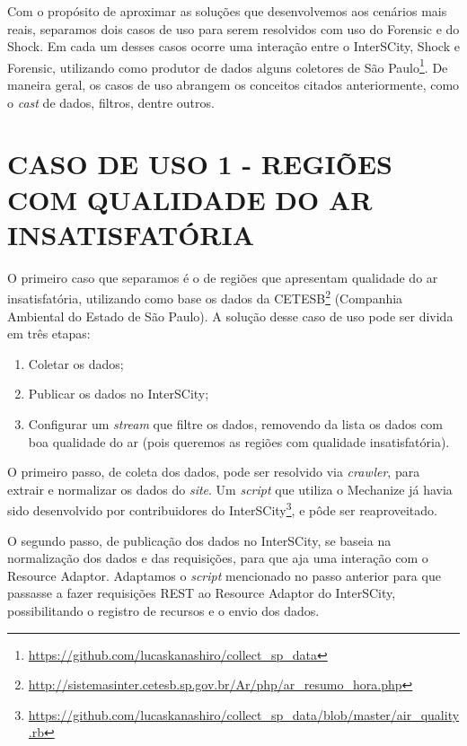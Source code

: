 Com o propósito de aproximar as soluções que desenvolvemos aos cenários mais
reais, separamos dois casos de uso para serem resolvidos com uso do Forensic e do
Shock. Em cada um desses casos ocorre uma interação entre o InterSCity, Shock e
Forensic, utilizando como produtor de dados alguns coletores de São
Paulo\footnote{\url{https://github.com/lucaskanashiro/collect_sp_data}}. De
maneira geral, os casos de uso abrangem os conceitos citados anteriormente,
como o \textit{cast} de dados, filtros, dentre outros.

\section{CASO DE USO 1 - REGIÕES COM QUALIDADE DO AR INSATISFATÓRIA}

O primeiro caso que separamos é o de regiões que apresentam qualidade do ar
insatisfatória, utilizando como base os dados da
CETESB\footnote{\url{http://sistemasinter.cetesb.sp.gov.br/Ar/php/ar_resumo_hora.php}}
(Companhia Ambiental do Estado de São Paulo).
A solução desse caso de uso pode ser divida em três etapas:
\begin{enumerate}
    \item Coletar os dados;
    \item Publicar os dados no InterSCity;
    \item Configurar um \textit{stream} que filtre os dados, removendo
        da lista os dados com boa qualidade do ar (pois queremos as regiões
        com qualidade insatisfatória).
\end{enumerate}

O primeiro passo, de coleta dos dados, pode ser resolvido via \textit{crawler},
para extrair e normalizar os dados do \textit{site}. Um \textit{script} que
utiliza o Mechanize já havia sido desenvolvido por contribuidores do
InterSCity\footnote{\url{https://github.com/lucaskanashiro/collect_sp_data/blob/master/air_quality.rb}},
e pôde ser reaproveitado.

O segundo passo, de publicação dos dados no InterSCity, se baseia na
normalização dos dados e das requisições, para que aja uma interação com o
Resource Adaptor. Adaptamos o \textit{script} mencionado no passo anterior
para que passasse a fazer requisições REST ao Resource Adaptor do InterSCity,
possibilitando o registro de recursos e o envio dos dados.




